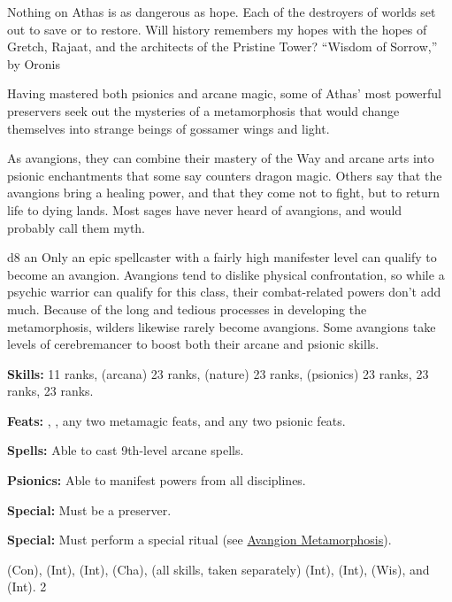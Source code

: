 {Nothing on Athas is as dangerous as hope. Each of the destroyers of worlds set out to save or to restore. Will history remembers my hopes with the hopes of Gretch, Rajaat, and the architects of the Pristine Tower?}
{``Wisdom of Sorrow,'' by Oronis}
{
Having mastered both psionics and arcane magic, some of Athas' most powerful preservers seek out the mysteries of a metamorphosis that would change themselves into strange beings of gossamer wings and light.

As avangions, they can combine their mastery of the Way and arcane arts into psionic enchantments that some say counters dragon magic. Others say that the avangions bring a healing power, and that they come not to fight, but to return life to dying lands. Most sages have never heard of avangions, and would probably call them myth.
}
{d8}
{an}
{
Only an epic spellcaster with a fairly high manifester level can qualify to become an avangion. Avangions tend to dislike physical confrontation, so while a psychic warrior can qualify for this class, their combat-related powers don't add much. Because of the long and tedious processes in developing the metamorphosis, wilders likewise rarely become avangions. Some avangions take levels of cerebremancer to boost both their arcane and psionic skills.
}
{
\textbf{Skills:}  11 ranks,  (arcana) 23 ranks,  (nature) 23 ranks,  (psionics) 23 ranks,  23 ranks,  23 ranks.

\textbf{Feats:} , , any two metamagic feats, and any two psionic feats.

\textbf{Spells:} Able to cast 9th-level arcane spells.

\textbf{Psionics:} Able to manifest powers from all disciplines.

\textbf{Special:} Must be a preserver.

\textbf{Special:} Must perform a special ritual (see \hyperref[Avangion Metamorphosis]{Avangion Metamorphosis}).
}
{
 (Con),  (Int),  (Int),  (Cha),  (all skills, taken separately) (Int),  (Int),  (Wis), and  (Int).
}
{2}
{\WarriorTable[ll *{3}{Z{12mm}} L]}
